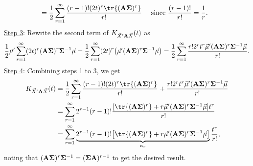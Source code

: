 \begin{Theorem}{}{}
\begin{align*}
         & =\frac{1}{2}\sum_{r=1}^{\infty}\frac{(r-1)!(2t)^r\tr{(\Matrix{A\Sigma})^r}}{r!} &  & \text{ since $\frac{(r-1)!}{r!}=\frac{1}{r}$}.
    \end{align*}
    \underline{Step 3}: Rewrite the second term of $  K_{\vec{X}'\mathbf{A}\vec{X}}(t) $ as
    \[ \frac{1}{2}\vec{\mu}' \sum_{r=1}^{\infty}(2t)^r(\mathbf{A\Sigma})^r
        \mathbf{\Sigma}^{-1}\vec{\mu}
        =\frac{1}{2}\sum_{r=1}^{\infty}(2t)^r\bigl(\vec{\mu}'(\mathbf{A\Sigma})^r \mathbf{\Sigma}^{-1}\vec{\mu}\bigr)
        =\frac{1}{2}\sum_{r=1}^{\infty}\frac{r! 2^r t^r\vec{\mu}'(\mathbf{A\Sigma})^r \mathbf{\Sigma}^{-1}\vec{\mu}}{r!}. \]
    \underline{Step 4}: Combining steps 1 to 3, we get
    \begin{align*}
        K_{\Vector{X}'\Matrix{A}\Vector{X}}(t)
         & =\frac{1}{2}\sum_{r=1}^{\infty}\frac{(r-1)!(2t)^r\tr{(\Matrix{A\Sigma})^r}}{r!}
        +\frac{r!2^r t^r \Vector{\mu}'(\Matrix{A\Sigma})^r \Matrix{\Sigma}^{-1}\Vector{\mu}}{r!}                                                                                              \\
         & =\sum_{r=1}^{\infty}2^{r-1}(r-1)! \frac{[\tr{(\Matrix{A\Sigma})^r}+r \Vector{\mu}'(\Matrix{A\Sigma})^r \Matrix{\Sigma}^{-1}\Vector{\mu}]t^r}{r!}                                   \\
         & =\sum_{r=1}^{\infty}\underbrace{2^{r-1}(r-1)!\bigl[\tr{(\Matrix{A\Sigma})^r}+r \Vector{\mu}'(\Matrix{A\Sigma})^r \Matrix{\Sigma}^{-1}\Vector{\mu}\bigr]}_{\kappa_r}\frac{t^r}{r!},
    \end{align*}
    noting that $ (\mathbf{A\Sigma})^r \mathbf{\Sigma}^{-1}=(\mathbf{\Sigma A})^{r-1} $
    to get the desired result.
\end{Theorem}